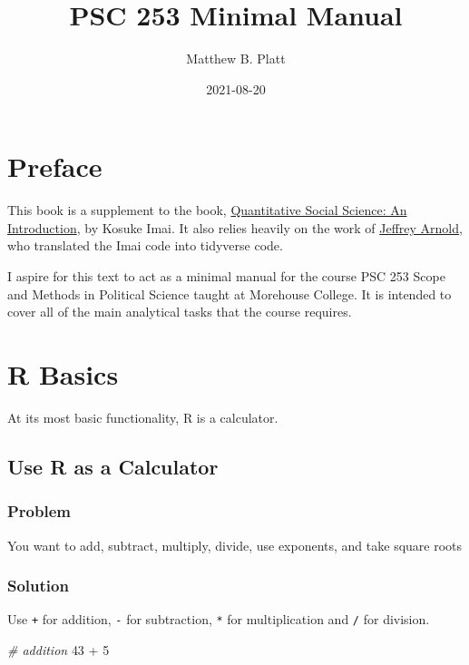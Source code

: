 \documentclass[
]{book}
\title{PSC 253 Minimal Manual}
\author{Matthew B. Platt}
\date{2021-08-20}
\newenvironment{Shaded}{\begin{snugshade}}{\end{snugshade}}
\newcommand{\CommentTok}[1]{\textcolor[rgb]{0.56,0.35,0.01}{\textit{#1}}}
\newcommand{\DecValTok}[1]{\textcolor[rgb]{0.00,0.00,0.81}{#1}}
\newcommand{\SpecialCharTok}[1]{\textcolor[rgb]{0.00,0.00,0.00}{#1}}
\begin{document}
\maketitle

{
\setcounter{tocdepth}{1}
\tableofcontents
}
\hypertarget{preface}{%
\chapter*{Preface}\label{preface}}

This book is a supplement to the book, \href{http://qss.princeton.press/}{Quantitative Social Science: An Introduction}, by Kosuke Imai. It also relies heavily on the work of \href{https://jrnold.github.io/qss-tidy/}{Jeffrey Arnold}, who translated the Imai code into tidyverse code.

I aspire for this text to act as a minimal manual for the course PSC 253 Scope and Methods in Political Science taught at Morehouse College. It is intended to cover all of the main analytical tasks that the course requires.

\hypertarget{basic}{%
\chapter{R Basics}\label{basic}}

At its most basic functionality, R is a calculator.

\hypertarget{calculate}{%
\section{Use R as a Calculator}\label{calculate}}

\hypertarget{problem}{%
\subsection{Problem}\label{problem}}

You want to add, subtract, multiply, divide, use exponents, and take square roots

\hypertarget{solution}{%
\subsection{Solution}\label{solution}}

Use \texttt{+} for addition, \texttt{-} for subtraction, \texttt{*} for multiplication and \texttt{/} for division.

\begin{Shaded}
\begin{Highlighting}[]
\CommentTok{\# addition}
\DecValTok{43} \SpecialCharTok{+} \DecValTok{5}
\end{Highlighting}
\end{Shaded}
\end{document}
